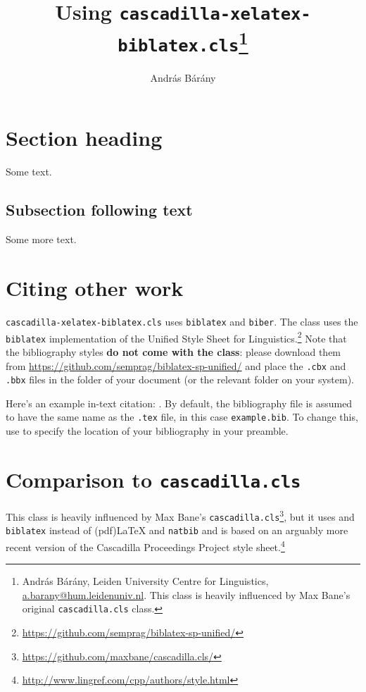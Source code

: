 \documentclass{cascadilla-xelatex-biblatex}
\title{Using \texttt{cascadilla-xelatex-biblatex.cls}\thanks{András Bárány, Leiden University Centre for Linguistics,
\url{a.barany@hum.leidenuniv.nl}. This class is heavily influenced by Max
Bane's original \texttt{cascadilla.cls} class.}}
\author{András Bárány}
\begin{document}
\maketitle

\section{Section heading}


Some text.

\subsection{Subsection following text}


Some more text.

\section{Citing other work}

\texttt{cascadilla-xelatex-biblatex.cls} uses \texttt{biblatex} and
\texttt{biber}. The class uses the \texttt{biblatex} implementation of the
Unified Style Sheet for
Linguistics.\footnote{\url{https://github.com/semprag/biblatex-sp-unified/}}
Note that the bibliography styles \textbf{do not come with the class}:
please download them from \url{https://github.com/semprag/biblatex-sp-unified/}
and place the \texttt{.cbx} and \texttt{.bbx} files in the folder of your
document (or the relevant folder on your system).

Here's an example in-text citation: \textcite{EKiss2008}. By default, the
bibliography file is assumed to have the same name as the \texttt{.tex} file,
in this case \texttt{example.bib}. To change this, use
\verb++ to specify the location of your bibliography in
your preamble.

\section{Comparison to \texttt{cascadilla.cls}}

This class is heavily influenced by Max Bane's
\texttt{cascadilla.cls}\footnote{\url{https://github.com/maxbane/cascadilla.cls/}},
but it uses \XeLaTeX{} and \texttt{biblatex} instead of (pdf)\LaTeX{} and
\texttt{natbib} and is based on an arguably more recent version of the
Cascadilla Proceedings Project style
sheet.\footnote{\url{http://www.lingref.com/cpp/authors/style.html}}
\end{document}
